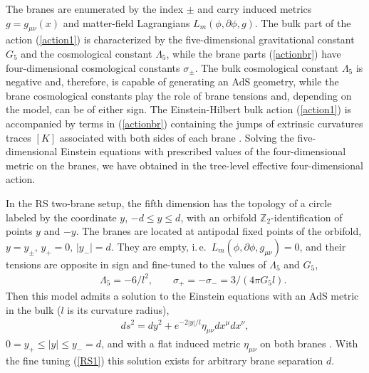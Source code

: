 \documentclass[a4paper,prl,twocolumn,amsmath,amssymb,showpacs]{revtex4}
\begin{document}
     The branes are enumerated by the index $\pm$ and carry induced metrics
     $g=g_{\mu\nu}(x)$ and matter-field Lagrangians
     $L_m(\phi,\partial\phi,g)$. The bulk part of the action (\ref{action1})
     is characterized by the five-dimensional gravitational constant $G_5$ and
     the cosmological constant $\Lambda_5$, while the brane parts
     (\ref{actionbr}) have four-dimensional cosmological constants
     $\sigma_\pm$.  The bulk cosmological constant $\Lambda_5$ is negative
     and, therefore, is capable of generating an AdS geometry, while the brane
     cosmological constants play the role of brane tensions and, depending on
     the model, can be of either sign. The Einstein-Hilbert bulk action
     (\ref{action1}) is accompanied by terms in (\ref{actionbr}) containing
     the jumps of extrinsic curvatures traces $[K]$ associated with both sides
     of each brane \cite{ChR}.  Solving the five-dimensional Einstein
     equations with prescribed values of the four-dimensional metric on the
     branes, we have obtained in \cite{we} the tree-level effective
     four-dimensional action.
 
In the RS two-brane setup, the fifth dimension has the topology of a circle
labeled by the coordinate $y$, $-d\leq y\leq d$, with an orbifold ${\mathbb
  Z}_2$-identification of points $y$ and $-y$. The branes are located at
antipodal fixed points of the orbifold, $y=y_\pm,\,y_+=0,\,|y_-|=d$. They are
empty, i.\,e.\ $L_m(\phi,\partial\phi,g_{\mu\nu})=0$, and their tensions are
opposite in sign and fine-tuned to the values of $\Lambda_5$ and $G_5$,
     \begin{eqnarray} 
     &&\Lambda_5=-6/l^2,\quad\quad 
     \sigma_+=-\sigma_-=3/(4\pi G_5l).   \label{RS1} 
     \end{eqnarray} 
Then this model admits a solution to the Einstein equations with an AdS 
metric in the bulk ($l$ is its curvature radius), 
     \begin{eqnarray} 
     ds^2=dy^2+e^{-2|y|/l}\eta_{\mu\nu}dx^\mu dx^\nu,  \label{RS2} 
     \end{eqnarray} 
$0=y_+\leq|y|\leq y_-=d$, and with a flat induced metric 
$\eta_{\mu\nu}$ on both branes \cite{RS1}. With the fine tuning 
(\ref{RS1}) this solution exists for arbitrary brane separation 
$d$. 
 
\end{document}
